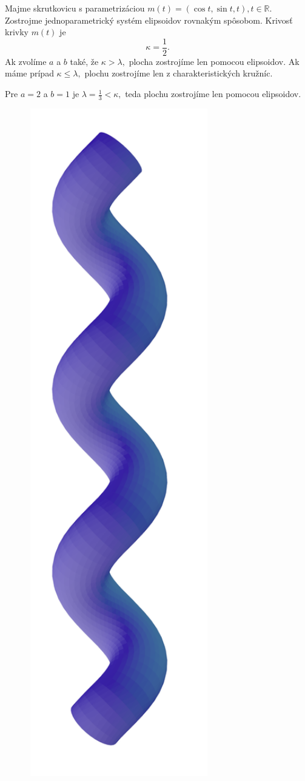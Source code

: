 \begin{example}[Skrutkovica]
\label{ex:helix}
Majme skrutkovicu s parametrizáciou $m(t)=(\cos t, \sin t, t), t \in \mathbb{R}.$ Zostrojme jednoparametrický systém elipsoidov rovnakým spôsobom.
Krivosť krivky $m(t)$ je
$$
\kappa = \frac{1}{2}.
$$
Ak zvolíme $a$ a $b$ také, že $\kappa > \lambda, $ plocha zostrojíme len pomocou elipsoidov.
Ak máme prípad $\kappa \leq \lambda,$ plochu zostrojíme len z charakteristických kružníc. 

Pre $a = 2$ a $b = 1$ je $\lambda = \frac{1}{3} < \kappa,$ teda plochu zostrojíme len pomocou elipsoidov.
\begin{figure}[H]
	\centering
	\includegraphics[angle=-90, width=0.7\textwidth]{images/helix_envelope.png}

\end{figure}
\end{example}
